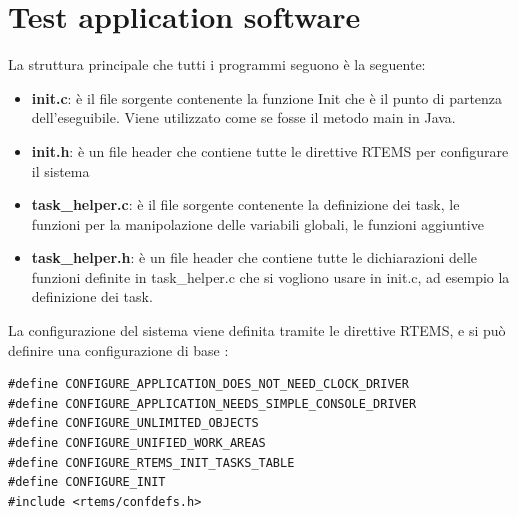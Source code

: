 \documentclass[12pt, a4paper, titlepage, oneside]{book}
\begin{document}
\section{Test application software}
La struttura principale che tutti i programmi seguono è la seguente:
\begin{itemize}
    \item \textbf{init.c}: è il file sorgente contenente la funzione Init che è il punto di partenza dell'eseguibile. Viene utilizzato come se fosse il metodo main in Java.
    \item \textbf{init.h}: è un file header che contiene tutte le direttive RTEMS per configurare il sistema
    \item \textbf{task\_helper.c}: è il file sorgente contenente la definizione dei task, le funzioni per la manipolazione delle variabili globali, le funzioni aggiuntive 
    \item \textbf{task\_helper.h}: è un file header che contiene tutte le dichiarazioni delle funzioni definite in task\_helper.c che si vogliono usare in init.c, ad esempio la definizione dei task.
\end{itemize}
La configurazione del sistema viene definita tramite le direttive RTEMS, e si può definire una configurazione di base :
\begin{lstlisting}[style = CStyle]
#define CONFIGURE_APPLICATION_DOES_NOT_NEED_CLOCK_DRIVER
#define CONFIGURE_APPLICATION_NEEDS_SIMPLE_CONSOLE_DRIVER
#define CONFIGURE_UNLIMITED_OBJECTS
#define CONFIGURE_UNIFIED_WORK_AREAS
#define CONFIGURE_RTEMS_INIT_TASKS_TABLE
#define CONFIGURE_INIT
#include <rtems/confdefs.h>
\end{lstlisting}
\end{document}

